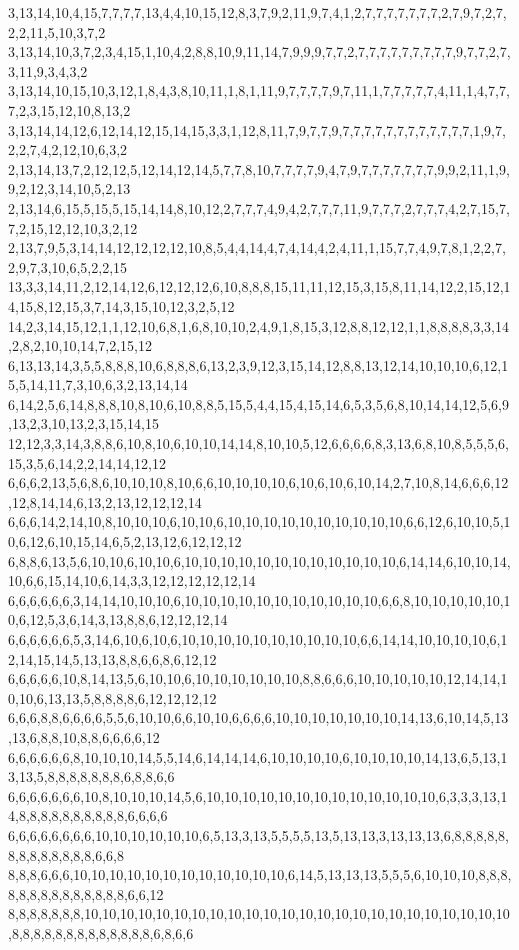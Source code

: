 3,13,14,10,4,15,7,7,7,7,13,4,4,10,15,12,8,3,7,9,2,11,9,7,4,1,2,7,7,7,7,7,7,7,2,7,9,7,2,7,2,2,11,5,10,3,7,2
3,13,14,10,3,7,2,3,4,15,1,10,4,2,8,8,10,9,11,14,7,9,9,9,7,7,2,7,7,7,7,7,7,7,7,7,9,7,7,2,7,3,11,9,3,4,3,2
3,13,14,10,15,10,3,12,1,8,4,3,8,10,11,1,8,1,11,9,7,7,7,7,9,7,11,1,7,7,7,7,7,4,11,1,4,7,7,7,2,3,15,12,10,8,13,2
3,13,14,14,12,6,12,14,12,15,14,15,3,3,1,12,8,11,7,9,7,7,9,7,7,7,7,7,7,7,7,7,7,7,7,1,9,7,2,2,7,4,2,12,10,6,3,2
2,13,14,13,7,2,12,12,5,12,14,12,14,5,7,7,8,10,7,7,7,7,9,4,7,9,7,7,7,7,7,7,7,9,9,2,11,1,9,9,2,12,3,14,10,5,2,13
2,13,14,6,15,5,15,5,15,14,14,8,10,12,2,7,7,7,4,9,4,2,7,7,7,11,9,7,7,7,2,7,7,7,4,2,7,15,7,7,2,15,12,12,10,3,2,12
2,13,7,9,5,3,14,14,12,12,12,12,10,8,5,4,4,14,4,7,4,14,4,2,4,11,1,15,7,7,4,9,7,8,1,2,2,7,2,9,7,3,10,6,5,2,2,15
13,3,3,14,11,2,12,14,12,6,12,12,12,6,10,8,8,8,15,11,11,12,15,3,15,8,11,14,12,2,15,12,14,15,8,12,15,3,7,14,3,15,10,12,3,2,5,12
14,2,3,14,15,12,1,1,12,10,6,8,1,6,8,10,10,2,4,9,1,8,15,3,12,8,8,12,12,1,1,8,8,8,8,3,3,14,2,8,2,10,10,14,7,2,15,12
6,13,13,14,3,5,5,8,8,8,10,6,8,8,8,6,13,2,3,9,12,3,15,14,12,8,8,13,12,14,10,10,10,6,12,15,5,14,11,7,3,10,6,3,2,13,14,14
6,14,2,5,6,14,8,8,8,10,8,10,6,10,8,8,5,15,5,4,4,15,4,15,14,6,5,3,5,6,8,10,14,14,12,5,6,9,13,2,3,10,13,2,3,15,14,15
12,12,3,3,14,3,8,8,6,10,8,10,6,10,10,14,14,8,10,10,5,12,6,6,6,6,8,3,13,6,8,10,8,5,5,5,6,15,3,5,6,14,2,2,14,14,12,12
6,6,6,2,13,5,6,8,6,10,10,10,8,10,6,6,10,10,10,10,6,10,6,10,6,10,14,2,7,10,8,14,6,6,6,12,12,8,14,14,6,13,2,13,12,12,12,14
6,6,6,14,2,14,10,8,10,10,10,6,10,10,6,10,10,10,10,10,10,10,10,10,10,6,6,12,6,10,10,5,10,6,12,6,10,15,14,6,5,2,13,12,6,12,12,12
6,8,8,6,13,5,6,10,10,6,10,10,6,10,10,10,10,10,10,10,10,10,10,10,10,6,14,14,6,10,10,14,10,6,6,15,14,10,6,14,3,3,12,12,12,12,12,14
6,6,6,6,6,6,3,14,14,10,10,10,6,10,10,10,10,10,10,10,10,10,10,10,6,6,8,10,10,10,10,10,10,6,12,5,3,6,14,3,13,8,8,6,12,12,12,14
6,6,6,6,6,6,5,3,14,6,10,6,10,6,10,10,10,10,10,10,10,10,10,10,6,6,14,14,10,10,10,10,6,12,14,15,14,5,13,13,8,8,6,6,8,6,12,12
6,6,6,6,6,10,8,14,13,5,6,10,10,6,10,10,10,10,10,10,8,8,6,6,6,10,10,10,10,10,12,14,14,10,10,6,13,13,5,8,8,8,8,6,12,12,12,12
6,6,6,8,8,6,6,6,6,5,5,6,10,10,6,6,10,10,6,6,6,6,10,10,10,10,10,10,10,14,13,6,10,14,5,13,13,6,8,8,10,8,8,6,6,6,6,12
6,6,6,6,6,6,8,10,10,10,14,5,5,14,6,14,14,14,6,10,10,10,10,6,10,10,10,10,14,13,6,5,13,13,13,5,8,8,8,8,8,8,8,6,8,8,6,6
6,6,6,6,6,6,6,10,8,10,10,10,14,5,6,10,10,10,10,10,10,10,10,10,10,10,10,10,6,3,3,3,13,14,8,8,8,8,8,8,8,8,8,8,6,6,6,6
6,6,6,6,6,6,6,6,10,10,10,10,10,10,6,5,13,3,13,5,5,5,5,13,5,13,13,3,13,13,13,6,8,8,8,8,8,8,8,8,8,8,8,8,8,6,6,8
8,8,8,6,6,6,10,10,10,10,10,10,10,10,10,10,10,10,6,14,5,13,13,13,5,5,5,6,10,10,10,8,8,8,8,8,8,8,8,8,8,8,8,8,8,6,6,12
8,8,8,8,8,8,8,10,10,10,10,10,10,10,10,10,10,10,10,10,10,10,10,10,10,10,10,10,10,10,10,8,8,8,8,8,8,8,8,8,8,8,8,8,6,8,6,6
